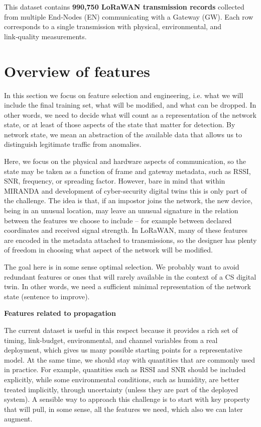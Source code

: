 \documentclass[11pt]{article}
\begin{document}
This dataset contains \textbf{990,750 LoRaWAN transmission records} collected from multiple End‑Nodes (EN) communicating with a Gateway (GW). Each row corresponds to a single transmission with physical, environmental, and link‑quality measurements.
\section{Overview of features}
\label{sec:org00b8353}

In this section we focus on feature selection and engineering,  i.e. what we will include the final training set, what will be modified, and what can be dropped. In other words, we need to decide what will count as a representation of the network state, or at least of those aspects of the state that matter for detection. By network state, we mean an abstraction of the available data that allows us to distinguish legitimate traffic from anomalies.

Here, we focus on the physical and hardware aspects of communication, so the state may be taken as a function of frame and gateway metadata, such as RSSI, SNR, frequency, or spreading factor. However, bare in mind that within MIRANDA and development of cyber-security digital twins this is only part of the challenge. The idea is that, if an impostor joins the network, the new device, being in an unusual location, may leave an unusual signature in the relation between the features we choose to include -- for example between declared coordinates and received signal strength. In LoRaWAN, many of these features are encoded in the metadata attached to transmissions, so the designer has plenty of freedom in choosing what aspect of the network will be modified.

The goal here is in some sense optimal selection. We probably want to avoid redundant features or ones that will rarely available in the context of a CS digital twin. In other words, we need a sufficient minimal representation of the network state (sentence to improve).

\textbf{Features related to propagation}

The current dataset is useful in this respect because it provides a rich set of timing, link-budget, environmental, and channel variables from a real deployment, which gives us many possible starting points for a representative model. At the same time, we should stay with quantities that are commonly used in practice. For example, quantities such as RSSI and SNR should be included explicitly, while some environmental conditions, such as humidity, are better treated implicitly, through uncertainty (unless they are part of the deployed system). A sensible way to approach this challenge is to start with key property that will pull, in some sense, all the features we need, which also we can later augment.
\end{document}
